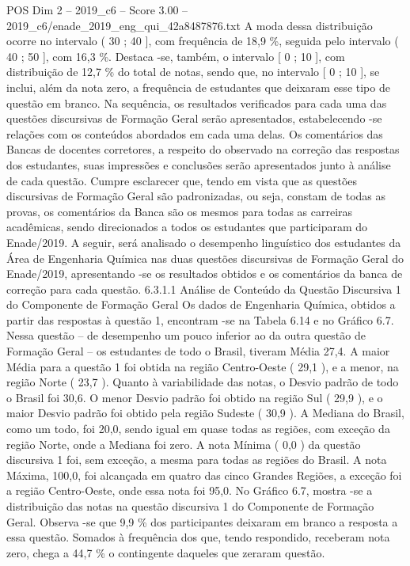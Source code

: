 \begin{textsample}{POS Dim 2 – 2019\_c6 – Score 3.00 – 2019\_c6/enade\_2019\_eng\_qui\_42a8487876.txt}
A moda dessa distribuição ocorre no intervalo ( 30 ; 40 ], com frequência de 18,9 \%, seguida pelo intervalo ( 40 ; 50 ], com 16,3 \%.
Destaca -se, também, o intervalo [ 0 ; 10 ], com distribuição de 12,7 \% do total de notas, sendo que, no intervalo [ 0 ; 10 ], se inclui, além da nota zero, a frequência de estudantes que deixaram esse tipo de questão em branco.
Na sequência, os resultados verificados para cada uma das questões discursivas de Formação Geral serão apresentados, estabelecendo -se relações com os conteúdos abordados em cada uma delas.
Os comentários das Bancas de docentes corretores, a respeito do observado na correção das respostas dos estudantes, suas impressões e conclusões serão apresentados junto à análise de cada questão.
Cumpre esclarecer que, tendo em vista que as questões discursivas de Formação Geral são padronizadas, ou seja, constam de todas as provas, os comentários da Banca são os mesmos para todas as carreiras acadêmicas, sendo direcionados a todos os estudantes que participaram do Enade/2019.
A seguir, será analisado o desempenho linguístico dos estudantes da Área de Engenharia Química nas duas questões discursivas de Formação Geral do Enade/2019, apresentando -se os resultados obtidos e os comentários da banca de correção para cada questão. 6.3.1.1 Análise de Conteúdo da Questão Discursiva 1 do Componente de Formação Geral Os dados de Engenharia Química, obtidos a partir das respostas à questão 1, encontram -se na Tabela 6.14 e no Gráfico 6.7.
Nessa questão – de desempenho um pouco inferior ao da outra questão de Formação Geral – os estudantes de todo o Brasil, tiveram Média 27,4.
A maior Média para a questão 1 foi obtida na região Centro-Oeste ( 29,1 ), e a menor, na região Norte ( 23,7 ).
Quanto à variabilidade das notas, o Desvio padrão de todo o Brasil foi 30,6.
O menor Desvio padrão foi obtido na região Sul ( 29,9 ), e o maior Desvio padrão foi obtido pela região Sudeste ( 30,9 ).
A Mediana do Brasil, como um todo, foi 20,0, sendo igual em quase todas as regiões, com exceção da região Norte, onde a Mediana foi zero.
A nota Mínima ( 0,0 ) da questão discursiva 1 foi, sem exceção, a mesma para todas as regiões do Brasil.
A nota Máxima, 100,0, foi alcançada em quatro das cinco Grandes Regiões, a exceção foi a região Centro-Oeste, onde essa nota foi 95,0.
No Gráfico 6.7, mostra -se a distribuição das notas na questão discursiva 1 do Componente de Formação Geral.
Observa -se que 9,9 \% dos participantes deixaram em branco a resposta a essa questão.
Somados à frequência dos que, tendo respondido, receberam nota zero, chega a 44,7 \% o contingente daqueles que zeraram questão.

\end{textsample}
